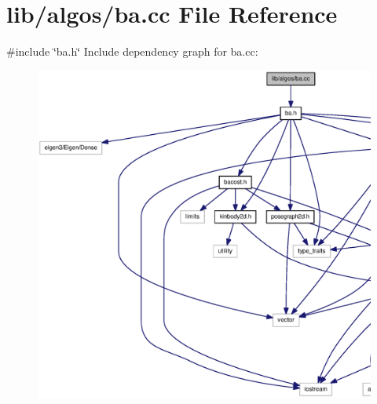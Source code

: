 \section{lib/algos/ba.cc \-File \-Reference}
\label{ba_8cc}
{\ttfamily \#include \char`\"{}ba.\-h\char`\"{}}\*
\-Include dependency graph for ba.\-cc\-:
\nopagebreak
\begin{figure}[H]
\begin{center}
\leavevmode
\includegraphics[width=350pt]{ba_8cc__incl}
\end{center}
\end{figure}
